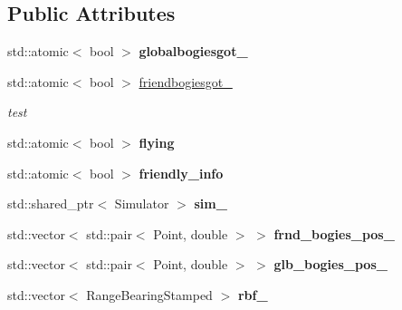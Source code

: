 \subsection*{Public Attributes}
\begin{DoxyCompactItemize}
\item 
\mbox{\label{classBogieposInterface_a5e1fd43a4b2bf930fc62e933282bec19}} 
std\+::atomic$<$ bool $>$ {\bfseries globalbogiesgot\+\_\+}
\item 
\mbox{\label{classBogieposInterface_a861afcebc5fb09e17f2e3b32922c9678}} 
std\+::atomic$<$ bool $>$ \hyperlink{classBogieposInterface_a861afcebc5fb09e17f2e3b32922c9678}{friendbogiesgot\+\_\+}
\begin{DoxyCompactList}\small\item\em test \end{DoxyCompactList}\item 
\mbox{\label{classBogieposInterface_a5caf6590a0e805f00fcfd472d48130ed}} 
std\+::atomic$<$ bool $>$ {\bfseries flying}
\item 
\mbox{\label{classBogieposInterface_a408d1de1da6941e99911a9af9f9875e2}} 
std\+::atomic$<$ bool $>$ {\bfseries friendly\+\_\+info}
\item 
\mbox{\label{classBogieposInterface_a80006e18bc4928eccc493937c891ce7c}} 
std\+::shared\+\_\+ptr$<$ Simulator $>$ {\bfseries sim\+\_\+}
\item 
\mbox{\label{classBogieposInterface_a1ce4e6797926bb18ef24c6bdd7372093}} 
std\+::vector$<$ std\+::pair$<$ Point, double $>$ $>$ {\bfseries frnd\+\_\+bogies\+\_\+pos\+\_\+}
\item 
\mbox{\label{classBogieposInterface_a3d4d80384d8372890c53068ccac2f734}} 
std\+::vector$<$ std\+::pair$<$ Point, double $>$ $>$ {\bfseries glb\+\_\+bogies\+\_\+pos\+\_\+}
\item 
\mbox{\label{classBogieposInterface_a3a77385b1c98cf6047dd8c5ba880b19a}} 
std\+::vector$<$ Range\+Bearing\+Stamped $>$ {\bfseries rbf\+\_\+}
\item 

\end{DoxyCompactItemize}
